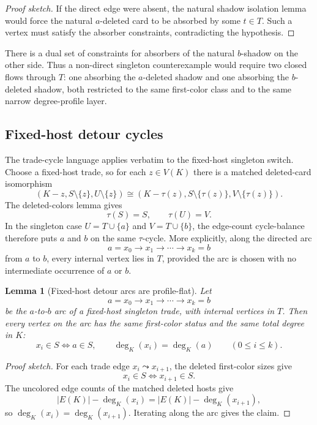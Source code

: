 \documentclass[11pt]{article}
\newtheorem{lemma}{Lemma}
\begin{document}
\begin{proof}[Proof sketch]
If the direct edge were absent, the natural shadow isolation lemma would force
the natural \(a\)-deleted card to be absorbed by some \(t\in T\).  Such a
vertex must satisfy the absorber constraints, contradicting the hypothesis.
\end{proof}

There is a dual set of constraints for absorbers of the natural \(b\)-shadow
on the other side.  Thus a non-direct singleton counterexample would require
two closed flows through \(T\): one absorbing the \(a\)-deleted shadow and one
absorbing the \(b\)-deleted shadow, both restricted to the same first-color
class and to the same narrow degree-profile layer.

\subsection{Fixed-host detour cycles}

The trade-cycle language applies verbatim to the fixed-host singleton switch.
Choose a fixed-host trade, so for each \(z\in V(K)\) there is a matched
deleted-card isomorphism
\[
  (K-z,S\setminus\{z\},U\setminus\{z\})
  \cong
  (K-\tau(z),S\setminus\{\tau(z)\},V\setminus\{\tau(z)\}).
\]
The deleted-colors lemma gives
\[
  \tau(S)=S,
  \qquad
  \tau(U)=V.
\]
In the singleton case \(U=T\cup\{a\}\) and \(V=T\cup\{b\}\), the edge-count
cycle-balance therefore puts \(a\) and \(b\) on the same \(\tau\)-cycle.
More explicitly, along the directed arc
\[
  a=x_0\to x_1\to\cdots\to x_k=b
\]
from \(a\) to \(b\), every internal vertex lies in \(T\), provided the arc is
chosen with no intermediate occurrence of \(a\) or \(b\).

\begin{lemma}[Fixed-host detour arcs are profile-flat]
Let
\[
  a=x_0\to x_1\to\cdots\to x_k=b
\]
be the \(a\)-to-\(b\) arc of a fixed-host singleton trade, with internal
vertices in \(T\).  Then every vertex on the arc has the same first-color
status and the same total degree in \(K\):
\[
  x_i\in S \Longleftrightarrow a\in S,
  \qquad
  \deg_K(x_i)=\deg_K(a)
  \qquad (0\leq i\leq k).
\]
\end{lemma}

\begin{proof}[Proof sketch]
For each trade edge \(x_i\leadsto x_{i+1}\), the deleted first-color sizes
give
\[
  x_i\in S \Longleftrightarrow x_{i+1}\in S.
\]
The uncolored edge counts of the matched deleted hosts give
\[
  |E(K)|-\deg_K(x_i)=|E(K)|-\deg_K(x_{i+1}),
\]
so \(\deg_K(x_i)=\deg_K(x_{i+1})\).  Iterating along the arc gives the claim.
\end{proof}
\end{document}
